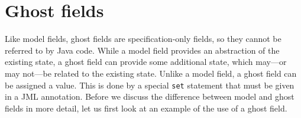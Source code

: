 \documentclass{llncs}
\begin{document}
\section{Ghost fields}
\label{Sec:ghost}


Like model fields, ghost fields are specification-only fields,
so they cannot be referred to by Java code.
While a model field provides an abstraction
of the existing state, a ghost field can provide some additional state,
which may---or may not---be related to the existing state.
Unlike a model field, a ghost field can
be assigned a value. This is done by a special \texttt{set} statement
that must be given in a JML annotation.
Before we discuss the difference between model and ghost fields
in more detail, let us first look at an example of the use of a ghost field.
\end{document}
